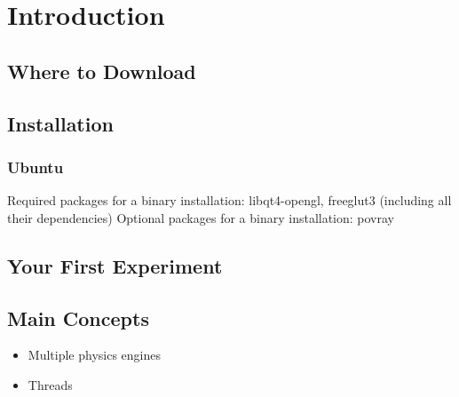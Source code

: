 \chapter{Introduction}
\section{Where to Download}
\section{Installation}
\subsection{Ubuntu}
Required packages for a binary installation: libqt4-opengl, freeglut3
(including all their dependencies)
Optional packages for a binary installation: povray
\section{Your First Experiment}
\section{Main Concepts}
\begin{itemize}
\item Multiple physics engines
\item Threads
\end{itemize}

